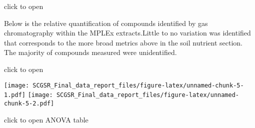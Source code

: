 \documentclass[
]{article}
\begin{document}
click to open

Below is the relative quantification of compounds identified by gas
chromatography within the MPLEx extracts.Little to no variation was
identified that corresponds to the more broad metrics above in the soil
nutrient section. The majority of compounds measured were unidentified.

click to open

\texttt{[image: SCGSR\_Final\_data\_report\_files/figure-latex/unnamed-chunk-5-1.pdf]}
\texttt{[image: SCGSR\_Final\_data\_report\_files/figure-latex/unnamed-chunk-5-2.pdf]}

click to open ANOVA table

\begin{longtable}[]{@{}
  >{\raggedright\arraybackslash}p{}
  >{\raggedleft\arraybackslash}p{}
  >{\raggedleft\arraybackslash}p{}
  >{\raggedleft\arraybackslash}p{}
  >{\raggedleft\arraybackslash}p{}
  >{\raggedleft\arraybackslash}p{}
  >{\raggedleft\arraybackslash}p{}
  >{\raggedleft\arraybackslash}p{}
  >{\raggedleft\arraybackslash}p{}
  >{\raggedleft\arraybackslash}p{}
  >{\raggedleft\arraybackslash}p{}
  >{\raggedleft\arraybackslash}p{}
  >{\raggedleft\arraybackslash}p{}
  >{\raggedleft\arraybackslash}p{}
  >{\raggedleft\arraybackslash}p{}
  >{\raggedleft\arraybackslash}p{}
  >{\raggedleft\arraybackslash}p{}
  >{\raggedleft\arraybackslash}p{}
  >{\raggedleft\arraybackslash}p{}
  >{\raggedleft\arraybackslash}p{}
  >{\raggedleft\arraybackslash}p{}
  >{\raggedleft\arraybackslash}p{}
  >{\raggedleft\arraybackslash}p{}
}
\end{longtable}
\end{document}
